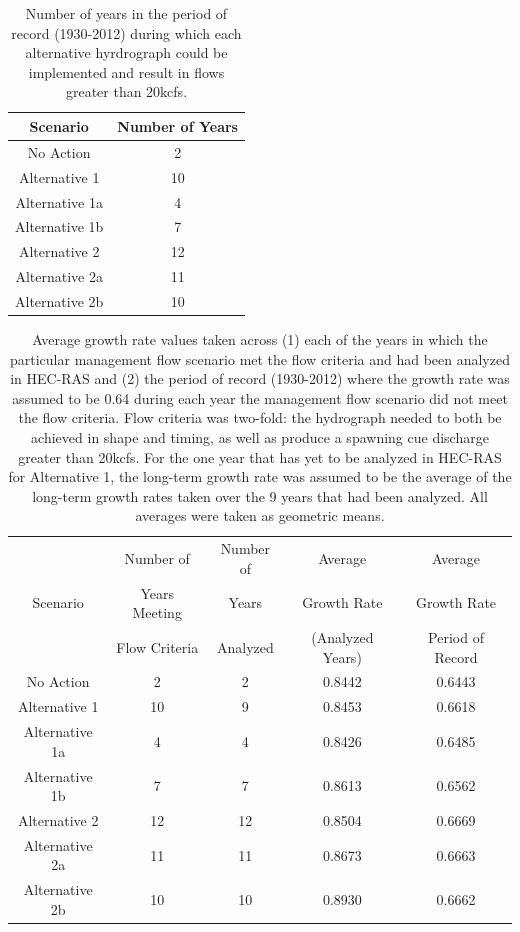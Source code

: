 \documentclass[12pt]{article}
\begin{document}
\newpage
\begin{table}[h]
\caption{Number of years in the period of record (1930-2012) during which each alternative hyrdrograph could be implemented and result in flows greater than 20kcfs.}
\centering
\begin{tabular}{cc}
\hline
Scenario & \hspace{12pt}Number of Years\hspace{12pt}\\
\hline
No Action & 2\\
Alternative 1 & 10\\
Alternative 1a & 4\\
Alternative 1b & 7\\
Alternative 2 & 12\\
Alternative 2a & 11\\
Alternative 2b & 10\\
\hline
\end{tabular}
\end{table}


\newpage
\begin{table}[h]
\caption{Average growth rate values taken across (1) each of the years in which the particular management flow scenario met the flow criteria and had been analyzed in HEC-RAS and (2) the period of record (1930-2012) where the growth rate was assumed to be 0.64 during each year the management flow scenario did not meet the flow criteria.  Flow criteria was two-fold: the hydrograph needed to both be achieved in shape and timing, as well as produce a spawning cue discharge greater than 20kcfs.  For the one year that has yet to be analyzed in HEC-RAS for Alternative 1, the long-term growth rate was assumed to be the average of the long-term growth rates taken over the 9 years that had been analyzed.  All averages were taken as geometric means.}
\centering
\begin{tabular}{ccccc}
\hline
& Number of & Number of  & Average & Average\\
Scenario & Years Meeting &  Years & Growth Rate & Growth Rate\\
& Flow Criteria & Analyzed & (Analyzed Years) & Period of Record\\
\hline
No Action & 2 & 2 & 0.8442 & 0.6443\\
Alternative 1 & 10 & 9 & 0.8453 & 0.6618\\
Alternative 1a & 4 & 4 & 0.8426 & 0.6485\\
Alternative 1b & 7 & 7 & 0.8613 & 0.6562\\
Alternative 2 & 12 & 12 & 0.8504 & 0.6669\\
Alternative 2a & 11 & 11 & 0.8673 & 0.6663\\
Alternative 2b & 10 & 10 & 0.8930 & 0.6662\\
\hline
\end{tabular}
\end{table}
\end{document}
